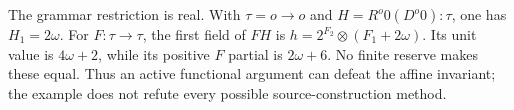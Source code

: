 \begin{example}\label{ex:functional-obstruction}
The grammar restriction is real.  With $\tau=o\to o$ and
$H=R^o0(D^o0):\tau$, one has $H_1=2\omega$.  For $F:\tau\to\tau$,
the first field of $FH$ is $h=2^{F_2}\otimes(F_1+2\omega)$.
Its unit value is $4\omega+2$, while its positive $F$ partial is
$2\omega+6$.  No finite reserve makes these equal.  Thus an active
functional argument can defeat the affine invariant; the example does
not refute every possible source-construction method.
\end{example}
